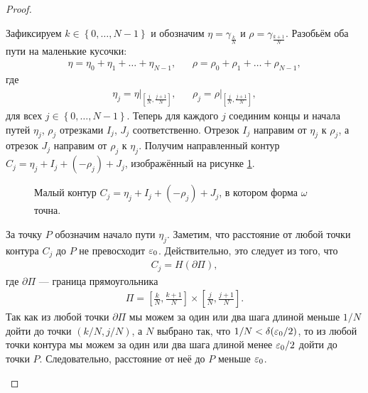 \begin{proof}
\begin{itemize}
   Зафиксируем $k \in \left\{ 0, \ldots, N-1 \right\}$ и обозначим $\eta = \gamma_{\frac{k}{N}}$  и $\rho = \gamma_{\frac{k+1}{N}}$. Разобьём оба пути на маленькие кусочки:
   \begin{align*}
    \eta = \eta_0 + \eta_1 + \ldots + \eta_{N-1}, & &\rho = \rho_0 + \rho_1 + \ldots + \rho_{N-1},
   \end{align*} где
   \begin{align*}
    \eta_j = \eta \rvert_{\left[\frac{j}{N},\frac{j+1}{N}\right]  }, & &\rho_j = \rho \rvert_{\left[\frac{j}{N},\frac{j+1}{N}\right]  },
   \end{align*} для всех $j \in \left\{ 0, \ldots, N - 1 \right\}$. Теперь для каждого $j$ соединим концы и начала путей $\eta_j$, $\rho_j$ отрезками $I_j$, $J_j$ соответственно. Отрезок $I_j$ направим от $\eta_j$ к $\rho_j$, а отрезок $J_j$ направим от $\rho_j$ к $\eta_j$. Получим направленный контур $C_j = \eta_j + I_j + (-\rho_j) + J_j$, изображённый на рисунке \ref{fig:closed_1_form_small_contur}.

   \begin{figure}[ht]
    \centering
    \caption{Малый контур $C_j = \eta_j + I_j + (-\rho_j) + J_j$, в котором форма $\omega$ точна.}
    \label{fig:closed_1_form_small_contur}
   \end{figure}

   За точку $P$ обозначим начало пути $\eta_j$. Заметим, что расстояние от любой точки контура $C_j$ до $P$ не превосходит $\varepsilon_0$. Действительно, это следует из того, что
   \begin{align*}
    C_j = H(\partial \Pi),
   \end{align*} где $\partial \Pi$ --- граница прямоугольника
   \begin{align*}
    \Pi = \left[ \frac{k}{N}, \frac{k+1}{N} \right] \times \left[ \frac{j}{N}, \frac{j+1}{N} \right].
   \end{align*} Так как из любой точки $\partial \Pi$ мы можем за один или два шага длиной меньше $1 / N$ дойти до точки $(k / N, j / N)$, а $N$ выбрано так, что $1 / N < \delta(\varepsilon_0 / 2)$, то из любой точки контура мы можем за один или два шага длиной менее $\varepsilon_0 / 2$ дойти до точки $P$. Следовательно, расстояние от неё до $P$ меньше $\varepsilon_0$.


\end{itemize}
\end{proof}

